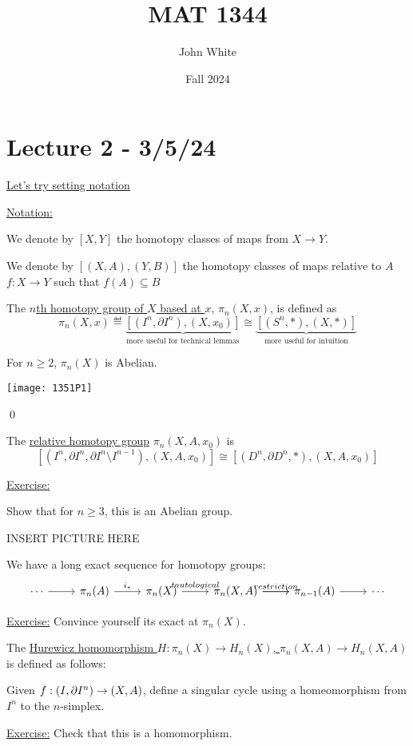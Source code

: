 \documentclass[x11names,reqno,14pt]{extarticle}
\title{MAT 1344}
\author{John White}
\date{Fall 2024}
\begin{document}
\section*{Lecture 2 - 3/5/24}

\underline{Let's try setting notation}

\underline{Notation:}

We denote by $[X,Y]$ the homotopy classes of maps from $X \to Y$. 

We denote by $[(X,A),(Y,B)]$ the homotopy classes of maps relative to $A$ $f:X\to Y$ such that $f(A)\subseteq B$


The \underline{$n$th homotopy group of $X$ based at $x$}, $\pi_n(X, x)$, is defined as 
\[
\pi_n(X,x) \eqdef \underbrace{[(I^n,\partial I^n), (X, x_0)]}_{\text{more useful for technical lemmas}} \cong \underbrace{[(S^n,*),(X,*)]}_{\text{more useful for intuition}}
\]

\lem

For $n \geq 2$, $\pi_n(X)$ is Abelian. 

\proof

\texttt{[image: 1351P1]}

\qed


The \underline{relative homotopy group} $\pi_n(X, A, x_0)$ is
\[
[(I^n, \partial I^n, \partial I^n\setminus I^{n-1}),(X,A,x_0)] \cong [(D^n, \partial D^n, *),(X,A,x_0)]
\]

\underline{Exercise:}

Show that for $n \geq 3$, this is an Abelian group. 

INSERT PICTURE HERE

We have a long exact sequence for homotopy groups:
\[
\begin{tikzcd}
\cdots \ar[r] & \pi_n(A) \ar[r, "i_*"] & \pi_n(X) \ar[r, "tautological"] & \ar[r, "restriction"] \pi_n(X,A) \ar[r] & \pi_{n-1}(A) \ar[r] & \cdots 
\end{tikzcd}
\]

\underline{Exercise:} Convince yourself its exact at $\pi_n(X)$. 


The \underline{Hurewicz homomorphism $H:\pi_n(X)\to H_n(X)$, $\pi_n(X,A) \to H_n(X, A)$} is defined as follows: 

Given $f:(I,\partial I^n) \to (X, A)$, define a singular cycle using a homeomorphism from $I^n$ to the $n$-simplex. 

\underline{Exercise:} Check that this is a homomorphism. 
\end{document}
